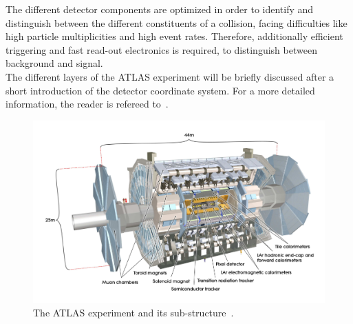 \noindent The different detector components are optimized in order to identify and distinguish between the different constituents of a collision, facing difficulties like high particle multiplicities and high event rates. Therefore,  additionally  efficient triggering and fast read-out electronics is required, to distinguish between background and signal.\\

\noindent The different layers of the ATLAS experiment will be briefly discussed after a short introduction of the detector coordinate system. For a more detailed information, the reader is refereed to~\cite{Aad:2008zzm,ATLAS:1999uwa}.   


\begin{figure}[t]
	\centering
	\includegraphics[width=1.0\linewidth]{Pics/cp3/33}
	\caption{The ATLAS experiment and its sub-structure~\cite{Aad:2008zzm}.} 
	\label{fig:33}
\end{figure}



